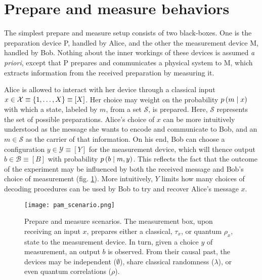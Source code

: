     \section{Prepare and measure behaviors}

        The simplest prepare and measure setup consists of two black-boxes. One is the preparation device P, handled by Alice, and the other the measurement device M, handled by Bob. Nothing about the inner workings of these devices is assumed \emph{a priori}, except that P prepares and communicates a physical system to M, which extracts information from the received preparation by measuring it.
    
        Alice is allowed to interact with her device through a classical input $x \in \mathcal{X} \equiv \{ 1, \ldots, X \} \equiv [X]$. Her choice may weight on the probability $p \left( m \mid x \right)$ with which a state, labeled by $m$, from a set $\mathcal{S}$, is prepared. Here, $\mathcal{S}$ represents the set of possible preparations. Alice's choice of $x$ can be more intuitively understood as the message she wants to encode and communicate to Bob, and an $m \in \mathcal{S}$ as the carrier of that information. On his end, Bob can choose a configuration $y \in \mathcal{Y} \equiv [Y]$ for the measurement device, which will thence output $b \in \mathcal{B} \equiv [B]$ with probability $p \left( b \mid m,y \right)$. This reflects the fact that the outcome of the experiment may be influenced by both the received message and Bob's choice of measurement (fig. \ref{fig:pam-scenario}). More intuitively, $Y$ limits how many choices of decoding procedures can be used by Bob to try and recover Alice's message $x$.

		\begin{figure}
			\begin{minipage}[c]{0.41\textwidth}
				\centering
				\texttt{[image: pam\_scenario.png]}
			\end{minipage}
			\begin{minipage}[c]{0.58\textwidth}
				\caption{Prepare and measure scenarios. The measurement box, upon receiving an input $x$, prepares either a classical, $\tau_x$, or quantum $\rho_x$, state to the measurement device. In turn, given a choice $y$ of measurement, an output $b$ is observed. From their causal past, the devices may be independent ($\emptyset$), share classical randomness ($\lambda$), or even quantum correlations ($\rho$).}	
				\label{fig:pam-scenario}
			\end{minipage}
		\end{figure}

